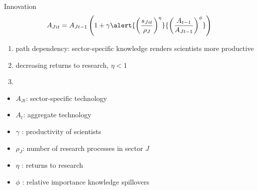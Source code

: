 \documentclass[11pt,aspectratio=169]{beamer}
\begin{document}
\addtocounter{framenumber}{-1}
\begin{frame}{Innovation}
	\large
	\begin{align*}
		A_{Jit}={A_{Jt-1}}\left(1+\gamma\alert{\left(\frac{s_{Jit}}{\rho_J}\right)^{\eta}}{\left(\frac{A_{t-1}}{A_{Jt-1}}\right)^\phi}\right)
	\end{align*}
	\normalsize
	\begin{enumerate}
		\item path dependency: sector-specific knowledge renders scientists more productive
		\item \alert{decreasing returns to research, $\eta<1$}
		\item[] \ %
	\end{enumerate}
	\small
	\vspace{4mm}
	\hspace{-2mm}
	\begin{minipage}[t!]{0.43\textwidth}
		\vspace{0mm}
		\begin{itemize}
			\item[] $A_{Jt}$: sector-specific technology
			\vspace{-2mm}		
			\item[] $A_t$: aggregate technology
			\vspace{-2mm}
			\item[] $\gamma$ : productivity of scientists
		\end{itemize}
	\end{minipage}
	\vspace{-5mm}
	\begin{minipage}[t!]{0.55\textwidth}
		\vspace{0mm}
		\begin{itemize}	
			\item[] \alert{$\rho_J$: number of research processes in sector $J$}
			\vspace{-2mm}			
			\item[] $\eta$ : returns to research
			\vspace{-2mm}			
			\item[] $\phi$ : relative importance knowledge spillovers
		\end{itemize}
	\end{minipage}
\end{frame}
\end{document}
